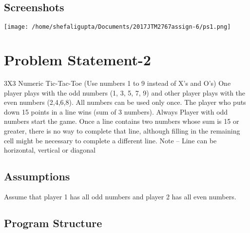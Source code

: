 \documentclass[a4paper,10pt]{report}
\begin{document}

\subsection{Screenshots}
\texttt{[image: /home/shefaligupta/Documents/2017JTM2767assign-6/ps1.png]}

\section{Problem Statement-2}

3X3 Numeric Tic-Tac-Toe (Use numbers 1 to 9 instead of X’s and O’s)
One player plays with the odd numbers (1, 3, 5, 7, 9) and other player plays with the even numbers (2,4,6,8). All numbers can be used only once. The player who puts down 15 points in a line wins (sum of 3 numbers). Always Player with odd numbers start the game. Once a line contains two numbers whose sum is 15 or greater, there is no way to complete that line, although filling in the remaining cell might be necessary to complete a different line.
Note – Line can be horizontal, vertical or diagonal


\subsection{Assumptions}
Assume that player 1 has all odd numbers and player 2 has all even numbers.

\subsection{Program Structure}
\end{document}
